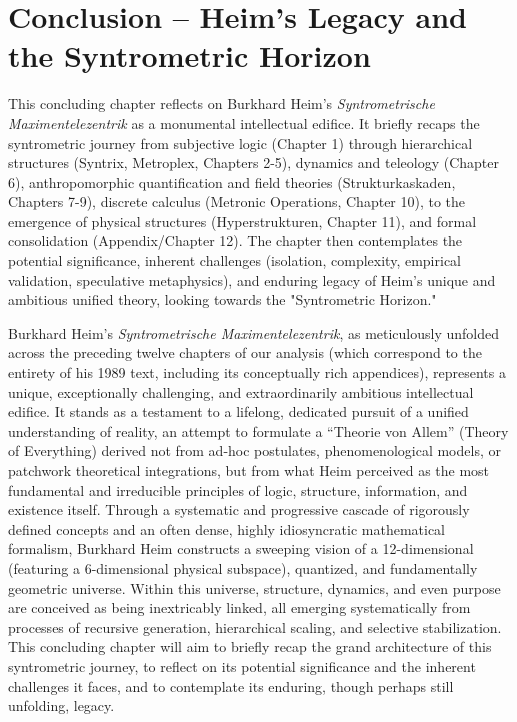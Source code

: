 \documentclass[12pt]{article}
\begin{document}
\section{Conclusion – Heim’s Legacy and the Syntrometric Horizon}
\label{sec:conclusion}

This concluding chapter reflects on Burkhard Heim’s \textit{Syntrometrische Maximentelezentrik} as a monumental intellectual edifice. It briefly recaps the syntrometric journey from subjective logic (Chapter 1) through hierarchical structures (Syntrix, Metroplex, Chapters 2-5), dynamics and teleology (Chapter 6), anthropomorphic quantification and field theories (Strukturkaskaden, Chapters 7-9), discrete calculus (Metronic Operations, Chapter 10), to the emergence of physical structures (Hyperstrukturen, Chapter 11), and formal consolidation (Appendix/Chapter 12). The chapter then contemplates the potential significance, inherent challenges (isolation, complexity, empirical validation, speculative metaphysics), and enduring legacy of Heim's unique and ambitious unified theory, looking towards the "Syntrometric Horizon."

Burkhard Heim’s \textit{Syntrometrische Maximentelezentrik}, as meticulously unfolded across the preceding twelve chapters of our analysis (which correspond to the entirety of his 1989 text, including its conceptually rich appendices), represents a unique, exceptionally challenging, and extraordinarily ambitious intellectual edifice. It stands as a testament to a lifelong, dedicated pursuit of a unified understanding of reality, an attempt to formulate a \enquote{Theorie von Allem} (Theory of Everything) derived not from ad-hoc postulates, phenomenological models, or patchwork theoretical integrations, but from what Heim perceived as the most fundamental and irreducible principles of logic, structure, information, and existence itself. Through a systematic and progressive cascade of rigorously defined concepts and an often dense, highly idiosyncratic mathematical formalism, Burkhard Heim constructs a sweeping vision of a 12-dimensional (featuring a 6-dimensional physical subspace), quantized, and fundamentally geometric universe. Within this universe, structure, dynamics, and even purpose are conceived as being inextricably linked, all emerging systematically from processes of recursive generation, hierarchical scaling, and selective stabilization. This concluding chapter will aim to briefly recap the grand architecture of this syntrometric journey, to reflect on its potential significance and the inherent challenges it faces, and to contemplate its enduring, though perhaps still unfolding, legacy.
\end{document}
